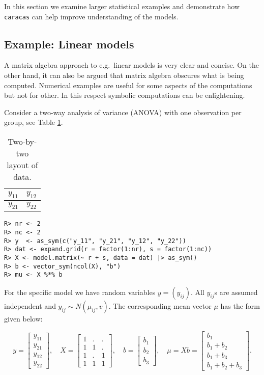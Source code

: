 In this section we examine larger statistical examples and
demonstrate how \texttt{caracas} can help improve understanding of the models.

\hypertarget{example-linear-models}{%
\subsection{Example: Linear models}\label{example-linear-models}}

A matrix algebra approach to e.g.~linear models is very clear and
concise. On the other hand, it can also be argued that matrix algebra
obscures what is being computed. Numerical examples are useful for
some aspects of the computations but not for other. In this respect
symbolic computations can be enlightening.

Consider a two-way analysis of variance (ANOVA) with one observation
per group, see Table \ref{tab:anova-two-way-table}.

\begin{table}[!h]

\caption{\label{tab:anova-two-way-table}Two-by-two layout of data.}
\centering
\begin{tabular}[t]{|>{}l|>{}l|}
\hline
$y_{11}$ & $y_{12}$\\
\hline
$y_{21}$ & $y_{22}$\\
\hline
\end{tabular}
\end{table}

\begin{verbatim}
R> nr <- 2
R> nc <- 2
R> y  <- as_sym(c("y_11", "y_21", "y_12", "y_22"))
R> dat <- expand.grid(r = factor(1:nr), s = factor(1:nc))
R> X <- model.matrix(~ r + s, data = dat) |> as_sym()
R> b <- vector_sym(ncol(X), "b")
R> mu <- X %*% b
\end{verbatim}

For the specific model we have random variables \(y=(y_{ij})\). All
\(y_{ij}\)s are assumed independent and \(y_{ij}\sim N(\mu_{ij}, v)\).
The corresponding mean vector \(\mu\) has the form given below:

\[
y = \left[\begin{matrix}y_{11}\\y_{21}\\y_{12}\\y_{22}\end{matrix}\right], \quad X=\left[\begin{matrix}1 & . & .\\1 & 1 & .\\1 & . & 1\\1 & 1 & 1\end{matrix}\right], \quad b=\left[\begin{matrix}b_{1}\\b_{2}\\b_{3}\end{matrix}\right], \quad  \mu = X b = \left[\begin{matrix}b_{1}\\b_{1} + b_{2}\\b_{1} + b_{3}\\b_{1} + b_{2} + b_{3}\end{matrix}\right] .
\]

